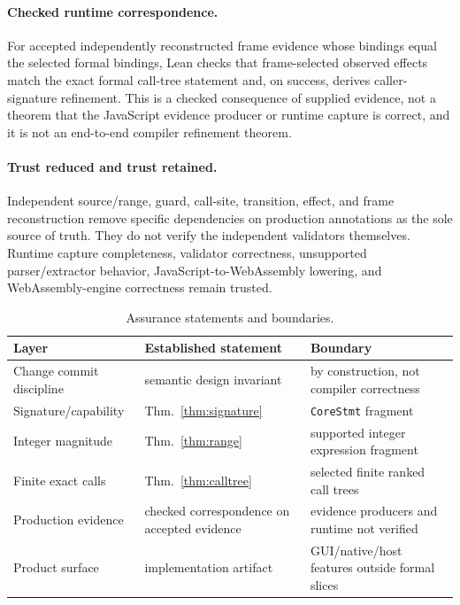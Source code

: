 \documentclass[10pt]{article}
\theoremstyle{plain}
\theoremstyle{remark}
\begin{document}
\paragraph{Checked runtime correspondence.}
For accepted independently reconstructed frame evidence whose bindings equal the selected formal bindings, Lean checks that frame-selected observed effects match the exact formal call-tree statement and, on success, derives caller-signature refinement. This is a checked consequence of supplied evidence, not a theorem that the JavaScript evidence producer or runtime capture is correct, and it is not an end-to-end compiler refinement theorem.

\paragraph{Trust reduced and trust retained.}
Independent source/range, guard, call-site, transition, effect, and frame reconstruction remove specific dependencies on production annotations as the sole source of truth. They do not verify the independent validators themselves. Runtime capture completeness, validator correctness, unsupported parser/extractor behavior, JavaScript-to-WebAssembly lowering, and WebAssembly-engine correctness remain trusted.

\begin{table}[t]
\centering
\caption{Assurance statements and boundaries.}
\label{tab:assurance-summary}
\small
\begin{tabular}{@{}lp{49mm}p{46mm}@{}}
\toprule
Layer & Established statement & Boundary \\
\midrule
Change commit discipline & semantic design invariant & by construction, not compiler correctness \\
Signature/capability & Thm.~\ref{thm:signature} & \texttt{CoreStmt} fragment \\
Integer magnitude & Thm.~\ref{thm:range} & supported integer expression fragment \\
Finite exact calls & Thm.~\ref{thm:calltree} & selected finite ranked call trees \\
Production evidence & checked correspondence on accepted evidence & evidence producers and runtime not verified \\
Product surface & implementation artifact & GUI/native/host features outside formal slices \\
\bottomrule
\end{tabular}
\end{table}
\end{document}
